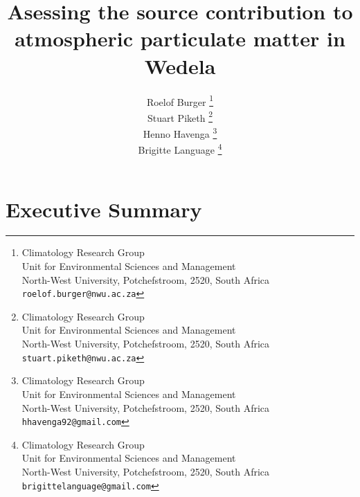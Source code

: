 \documentclass{nwureport}
\begin{document}


     \title{Asessing the source contribution to atmospheric particulate matter in Wedela}
     \author{
        Roelof Burger
          \thanks{
             Climatology Research Group\\
             Unit for Environmental Sciences and Management \\
             North-West University, Potchefstroom, 2520, South Africa \\
             {\tt roelof.burger@nwu.ac.za}} \\
        Stuart Piketh
          \thanks{
             Climatology Research Group\\
             Unit for Environmental Sciences and Management \\
             North-West University, Potchefstroom, 2520, South Africa \\
             {\tt stuart.piketh@nwu.ac.za}} \\
        Henno Havenga
          \thanks{
             Climatology Research Group\\
             Unit for Environmental Sciences and Management \\
             North-West University, Potchefstroom, 2520, South Africa \\
             {\tt hhavenga92@gmail.com}} \\
        Brigitte Language
          \thanks{
             Climatology Research Group\\
             Unit for Environmental Sciences and Management \\
             North-West University, Potchefstroom, 2520, South Africa \\
             {\tt brigittelanguage@gmail.com}} \\
     }
     \maketitle


\chapter*{Executive Summary}
\end{document}
